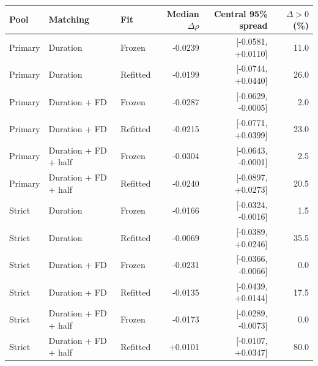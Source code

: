 \begin{tabular}{lllrrr}
\toprule
Pool & Matching & Fit & Median $\Delta\rho$ & Central 95\% spread & $\Delta>0$ (\%) \\
\midrule
Primary & Duration & Frozen & -0.0239 & [-0.0581, +0.0110] & 11.0 \\
Primary & Duration & Refitted & -0.0199 & [-0.0744, +0.0440] & 26.0 \\
Primary & Duration + FD & Frozen & -0.0287 & [-0.0629, -0.0005] & 2.0 \\
Primary & Duration + FD & Refitted & -0.0215 & [-0.0771, +0.0399] & 23.0 \\
Primary & Duration + FD + half & Frozen & -0.0304 & [-0.0643, -0.0001] & 2.5 \\
Primary & Duration + FD + half & Refitted & -0.0240 & [-0.0897, +0.0273] & 20.5 \\
Strict & Duration & Frozen & -0.0166 & [-0.0324, -0.0016] & 1.5 \\
Strict & Duration & Refitted & -0.0069 & [-0.0389, +0.0246] & 35.5 \\
Strict & Duration + FD & Frozen & -0.0231 & [-0.0366, -0.0066] & 0.0 \\
Strict & Duration + FD & Refitted & -0.0135 & [-0.0439, +0.0144] & 17.5 \\
Strict & Duration + FD + half & Frozen & -0.0173 & [-0.0289, -0.0073] & 0.0 \\
Strict & Duration + FD + half & Refitted & +0.0101 & [-0.0107, +0.0347] & 80.0 \\
\bottomrule
\end{tabular}
